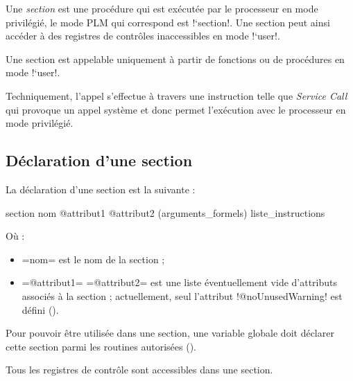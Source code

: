 
Une \emph{section} est une procédure qui est exécutée par le processeur en mode privilégié, le mode PLM qui correspond est \plm!`section!. Une section peut ainsi accéder à des registres de contrôles inaccessibles en mode \plm!`user!.

Une section est appelable uniquement à partir de fonctions ou de procédures en mode \plm!`user!.

Techniquement, l'appel s'effectue à travers une instruction telle que \emph{Service Call} qui provoque un appel système et donc permet l'exécution avec le processeur en mode privilégié.



\subsection{Déclaration d'une section}


La déclaration d'une section est la suivante :
\begin{PLM}
section nom @attribut1 @attribut2 (arguments_formels) {
  liste_instructions
}
\end{PLM}
Où :
\begin{itemize}
  \item \plm=nom= est le nom de la section ;
  \item \plm=@attribut1= \plm=@attribut2= est une liste éventuellement vide d'attributs associés à la section ; actuellement, seul l'attribut \plm!@noUnusedWarning! est défini ().
\end{itemize}




Pour pouvoir être utilisée dans une section, une variable globale doit déclarer cette section parmi les routines autorisées ().




Tous les registres de contrôle sont accessibles dans une section.








